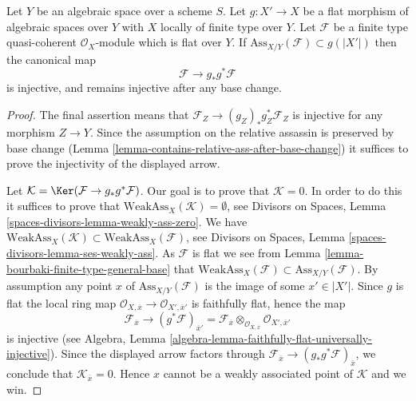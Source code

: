 \begin{lemma}
\label{lemma-universally-separating}
Let $Y$ be an algebraic space over a scheme $S$.
Let $g : X' \to X$ be a flat morphism of algebraic spaces over $Y$
with $X$ locally of finite type over $Y$.
Let $\mathcal{F}$ be a finite type quasi-coherent $\mathcal{O}_X$-module
which is flat over $Y$. If $\text{Ass}_{X/Y}(\mathcal{F}) \subset g(|X'|)$
then the canonical map
$$
\mathcal{F} \longrightarrow g_*g^*\mathcal{F}
$$
is injective, and remains injective after any base change.
\end{lemma}

\begin{proof}
The final assertion means that $\mathcal{F}_Z \to (g_Z)_*g_Z^*\mathcal{F}_Z$
is injective for any morphism $Z \to Y$. Since the assumption on
the relative assassin is preserved by base change
(Lemma \ref{lemma-contains-relative-ass-after-base-change})
it suffices to prove the injectivity of the displayed arrow.

\medskip\noindent
Let $\mathcal{K} = \Ker(\mathcal{F} \to g_*g^*\mathcal{F})$.
Our goal is to prove that $\mathcal{K} = 0$.
In order to do this it suffices to prove that
$\text{WeakAss}_X(\mathcal{K}) = \emptyset$, see
Divisors on Spaces, Lemma \ref{spaces-divisors-lemma-weakly-ass-zero}.
We have
$\text{WeakAss}_X(\mathcal{K}) \subset \text{WeakAss}_X(\mathcal{F})$, see
Divisors on Spaces, Lemma \ref{spaces-divisors-lemma-ses-weakly-ass}.
As $\mathcal{F}$ is flat we see from
Lemma \ref{lemma-bourbaki-finite-type-general-base}
that $\text{WeakAss}_X(\mathcal{F}) \subset \text{Ass}_{X/Y}(\mathcal{F})$.
By assumption any point $x$ of $\text{Ass}_{X/Y}(\mathcal{F})$
is the image of some $x' \in |X'|$. Since $g$ is flat the
local ring map
$\mathcal{O}_{X, \overline{x}} \to \mathcal{O}_{X', \overline{x}'}$
is faithfully flat, hence the map
$$
\mathcal{F}_{\overline{x}}
\longrightarrow
(g^*\mathcal{F})_{\overline{x}'} =
\mathcal{F}_{\overline{x}} \otimes_{\mathcal{O}_{X, \overline{x}}}
\mathcal{O}_{X', \overline{x}'}
$$
is injective (see
Algebra, Lemma \ref{algebra-lemma-faithfully-flat-universally-injective}).
Since the displayed arrow factors through
$\mathcal{F}_{\overline{x}} \to (g_*g^*\mathcal{F})_{\overline{x}}$,
we conclude that
$\mathcal{K}_{\overline{x}} = 0$. Hence $x$ cannot be a weakly associated
point of $\mathcal{K}$ and we win.
\end{proof}









